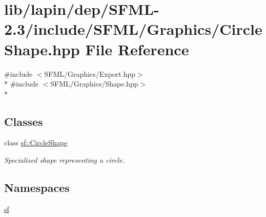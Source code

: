 \hypertarget{lapin_2dep_2_s_f_m_l-2_83_2include_2_s_f_m_l_2_graphics_2_circle_shape_8hpp}{\section{lib/lapin/dep/\-S\-F\-M\-L-\/2.3/include/\-S\-F\-M\-L/\-Graphics/\-Circle\-Shape.hpp File Reference}
\label{lapin_2dep_2_s_f_m_l-2_83_2include_2_s_f_m_l_2_graphics_2_circle_shape_8hpp}
}
{\ttfamily \#include $<$S\-F\-M\-L/\-Graphics/\-Export.\-hpp$>$}\\*
{\ttfamily \#include $<$S\-F\-M\-L/\-Graphics/\-Shape.\-hpp$>$}\\*
\subsection*{Classes}
\begin{DoxyCompactItemize}
\item 
class \hyperlink{classsf_1_1_circle_shape}{sf\-::\-Circle\-Shape}
\begin{DoxyCompactList}\small\item\em Specialized shape representing a circle. \end{DoxyCompactList}\end{DoxyCompactItemize}
\subsection*{Namespaces}
\begin{DoxyCompactItemize}
\item 
\hyperlink{namespacesf}{sf}
\end{DoxyCompactItemize}
